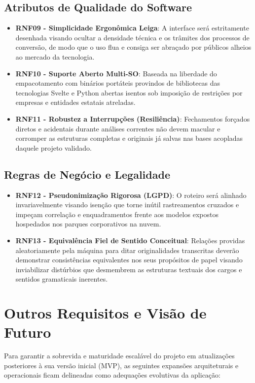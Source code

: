 \documentclass{scrreprt}
\begin{document}
\section{Atributos de Qualidade do Software}
\begin{itemize}
    \item \textbf{RNF09 - Simplicidade Ergonômica Leiga}: A interface será estritamente desenhada visando ocultar a densidade técnica e os trâmites dos processos de conversão, de modo que o uso flua e consiga ser abraçado por públicos alheios ao mercado da tecnologia.
    \item \textbf{RNF10 - Suporte Aberto Multi-SO}: Baseada na liberdade do empacotamento com binários portáteis provindos de bibliotecas das tecnologias Svelte e Python abertas isentos sob imposição de restrições por empresas e entidades estatais atreladas.
    \item \textbf{RNF11 - Robustez a Interrupções (Resiliência)}: Fechamentos forçados diretos e acidentais durante análises correntes não devem macular e corromper as estruturas completas e originais já salvas nas bases acopladas daquele projeto validado.
\end{itemize}

\section{Regras de Negócio e Legalidade}
\begin{itemize}
    \item \textbf{RNF12 - Pseudonimização Rigorosa (LGPD)}: O roteiro será alinhado invariavelmente visando isenção que torne inútil rastreamentos cruzados e impeçam correlação e enquadramentos frente aos modelos expostos hospedados nos parques corporativos na nuvem.
    \item \textbf{RNF13 - Equivalência Fiel de Sentido Conceitual}: Relações providas aleatoriamente pela máquina para ditar originalidades transcritas deverão demonstrar consistências equivalentes nos seus propósitos de papel visando inviabilizar distúrbios que desmembrem as estruturas textuais dos cargos e sentidos gramaticais inerentes.
\end{itemize}

\chapter{Outros Requisitos e Visão de Futuro}
Para garantir a sobrevida e maturidade escalável do projeto em atualizações posteriores à sua versão inicial (MVP), as seguintes expansões arquiteturais e operacionais ficam delineadas como adequações evolutivas da aplicação:
\end{document}
